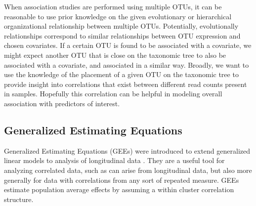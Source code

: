 \documentclass[12pt]{article}
\begin{document}
When association studies are performed using multiple OTUs, it can be reasonable to use prior knowledge on the given evolutionary or hierarchical organizational relationship between multiple OTUs. Potentially, evolutionally relationships correspond to similar relationships between OTU expression and chosen covariates. If a certain OTU is found to be associated with a covariate, we might expect another OTU that is close on the taxonomic tree to  also be associated with a covariate, and associated in a similar way. Broadly, we want to use the knowledge of the placement of a given OTU on the taxonomic tree to provide insight into correlations that exist between different read counts present in samples. Hopefully this correlation can be helpful in modeling overall association with predictors of interest.





\subsection{Generalized Estimating Equations}

Generalized Estimating Equations (GEEs) were introduced to extend generalized linear models to analysis of longitudinal data \cite{liang1986longitudinal}. They are a useful tool for analyzing correlated data, such as can arise from longitudinal data, but also more generally for data with correlations from any sort of repeated measure. GEEs estimate population average effects by assuming a within cluster correlation structure.



\end{document}
